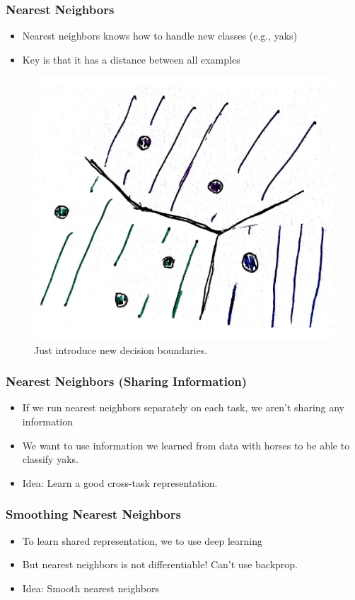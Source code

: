\documentclass[10pt,mathserif]{beamer}
\begin{document}
\begin{frame}
  \frametitle{Nearest Neighbors}
  \begin{itemize}
  \item Nearest neighbors knows how to handle new classes (e.g., yaks)
  \item Key is that it has a distance between all examples
  \end{itemize} 
  \begin{figure}[ht]
    \centering
    \includegraphics[width=0.40\paperwidth]{figure/nneighbor_4}
    \caption{Just introduce new decision boundaries. \label{fig:nneighbor_4} }
  \end{figure}
\end{frame}

\begin{frame}
  \frametitle{Nearest Neighbors (Sharing Information)}
 \begin{itemize}
 \item If we run nearest neighbors separately on each task, we aren't sharing
   any information
 \item We want to use information we learned from data with horses to be able to
   classify yaks.
 \item Idea: Learn a good cross-task representation.
 \end{itemize} 
\end{frame}

\begin{frame}
  \frametitle{Smoothing Nearest Neighbors}
 \begin{itemize}
 \item To learn shared representation, we to use deep learning
 \item But nearest neighbors is not differentiable! Can't use backprop.
 \item Idea: Smooth nearest neighbors
 \end{itemize} 
\end{frame}
\end{document}
